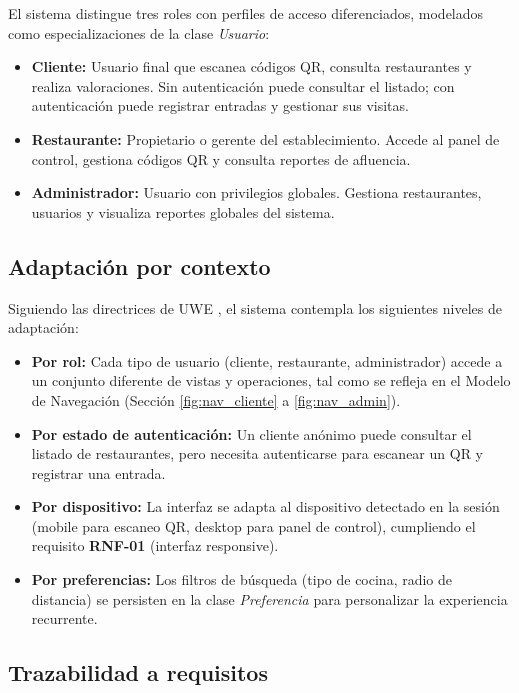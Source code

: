 El sistema distingue tres roles con perfiles de acceso diferenciados, modelados como especializaciones de la clase \textit{Usuario}:

\begin{itemize}
    \item \textbf{Cliente:} Usuario final que escanea códigos QR, consulta restaurantes y realiza valoraciones. Sin autenticación puede consultar el listado; con autenticación puede registrar entradas y gestionar sus visitas.
    \item \textbf{Restaurante:} Propietario o gerente del establecimiento. Accede al panel de control, gestiona códigos QR y consulta reportes de afluencia.
    \item \textbf{Administrador:} Usuario con privilegios globales. Gestiona restaurantes, usuarios y visualiza reportes globales del sistema.
\end{itemize}

\subsection{Adaptación por contexto}

Siguiendo las directrices de UWE \cite{UWE2014}, el sistema contempla los siguientes niveles de adaptación:

\begin{itemize}
    \item \textbf{Por rol:} Cada tipo de usuario (cliente, restaurante, administrador) accede a un conjunto diferente de vistas y operaciones, tal como se refleja en el Modelo de Navegación (Sección \ref{fig:nav_cliente} a \ref{fig:nav_admin}).
    \item \textbf{Por estado de autenticación:} Un cliente anónimo puede consultar el listado de restaurantes, pero necesita autenticarse para escanear un QR y registrar una entrada.
    \item \textbf{Por dispositivo:} La interfaz se adapta al dispositivo detectado en la sesión (mobile para escaneo QR, desktop para panel de control), cumpliendo el requisito \textbf{RNF-01} (interfaz responsive).
    \item \textbf{Por preferencias:} Los filtros de búsqueda (tipo de cocina, radio de distancia) se persisten en la clase \textit{Preferencia} para personalizar la experiencia recurrente.
\end{itemize}

\subsection{Trazabilidad a requisitos}

